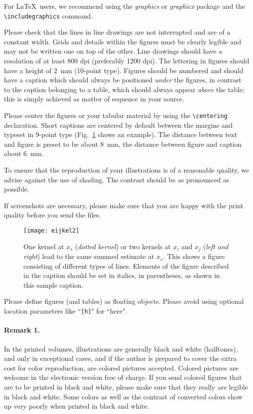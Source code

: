 \documentclass[runningheads,a4paper]{llncs}
\begin{document}
For \LaTeX\ users, we recommend using the \emph{graphics} or \emph{graphicx}
package and the \verb+\includegraphics+ command.

Please check that the lines in line drawings are not
interrupted and are of a constant width. Grids and details within the
figures must be clearly legible and may not be written one on top of
the other. Line drawings should have a resolution of at least 800 dpi
(preferably 1200 dpi). The lettering in figures should have a height of
2~mm (10-point type). Figures should be numbered and should have a
caption which should always be positioned \emph{under} the figures, in
contrast to the caption belonging to a table, which should always appear
\emph{above} the table; this is simply achieved as matter of sequence in
your source.

Please center the figures or your tabular material by using the \verb+\centering+
declaration. Short captions are centered by default between the margins
and typeset in 9-point type (Fig.~\ref{fig:example} shows an example).
The distance between text and figure is preset to be about 8~mm, the
distance between figure and caption about 6~mm.

To ensure that the reproduction of your illustrations is of a reasonable
quality, we advise against the use of shading. The contrast should be as
pronounced as possible.

If screenshots are necessary, please make sure that you are happy with
the print quality before you send the files.
\begin{figure}
\centering
\texttt{[image: eijkel2]}
\caption{One kernel at $x_s$ (\emph{dotted kernel}) or two kernels at
$x_i$ and $x_j$ (\textit{left and right}) lead to the same summed estimate
at $x_s$. This shows a figure consisting of different types of
lines. Elements of the figure described in the caption should be set in
italics, in parentheses, as shown in this sample caption.}
\label{fig:example}
\end{figure}

Please define figures (and tables) as floating objects. Please avoid
using optional location parameters like ``\verb+[h]+" for ``here".

\paragraph{Remark 1.}

In the printed volumes, illustrations are generally black and white
(halftones), and only in exceptional cases, and if the author is
prepared to cover the extra cost for color reproduction, are colored
pictures accepted. Colored pictures are welcome in the electronic
version free of charge. If you send colored figures that are to be
printed in black and white, please make sure that they really are
legible in black and white. Some colors as well as the contrast of
converted colors show up very poorly when printed in black and white.
\end{document}
